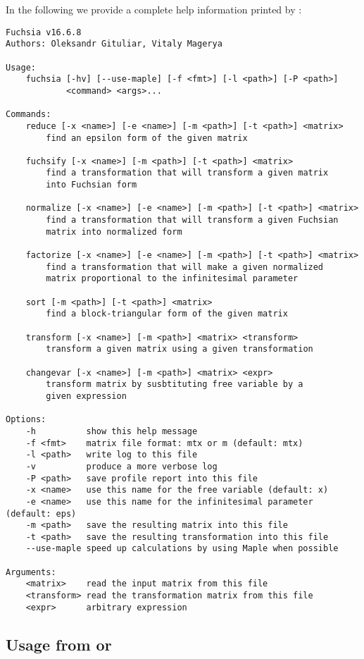\documentclass[12pt,a4paper]{article}
\begin{document}
In the following we provide a complete help information printed by :
\begin{Verbatim}
Fuchsia v16.6.8
Authors: Oleksandr Gituliar, Vitaly Magerya

Usage:
    fuchsia [-hv] [--use-maple] [-f <fmt>] [-l <path>] [-P <path>]
            <command> <args>...

Commands:
    reduce [-x <name>] [-e <name>] [-m <path>] [-t <path>] <matrix>
        find an epsilon form of the given matrix

    fuchsify [-x <name>] [-m <path>] [-t <path>] <matrix>
        find a transformation that will transform a given matrix
        into Fuchsian form

    normalize [-x <name>] [-e <name>] [-m <path>] [-t <path>] <matrix>
        find a transformation that will transform a given Fuchsian
        matrix into normalized form

    factorize [-x <name>] [-e <name>] [-m <path>] [-t <path>] <matrix>
        find a transformation that will make a given normalized
        matrix proportional to the infinitesimal parameter

    sort [-m <path>] [-t <path>] <matrix>
        find a block-triangular form of the given matrix

    transform [-x <name>] [-m <path>] <matrix> <transform>
        transform a given matrix using a given transformation

    changevar [-x <name>] [-m <path>] <matrix> <expr>
        transform matrix by susbtituting free variable by a
        given expression

Options:
    -h          show this help message
    -f <fmt>    matrix file format: mtx or m (default: mtx)
    -l <path>   write log to this file
    -v          produce a more verbose log
    -P <path>   save profile report into this file
    -x <name>   use this name for the free variable (default: x)
    -e <name>   use this name for the infinitesimal parameter (default: eps)
    -m <path>   save the resulting matrix into this file
    -t <path>   save the resulting transformation into this file
    --use-maple speed up calculations by using Maple when possible

Arguments:
    <matrix>    read the input matrix from this file
    <transform> read the transformation matrix from this file
    <expr>      arbitrary expression
\end{Verbatim}


\subsection{Usage from \sage or \python}
\label{sec:usage_py}
\end{document}
